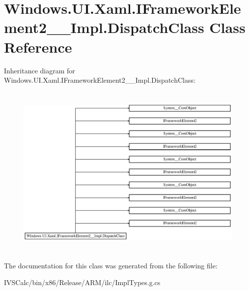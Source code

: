 \hypertarget{class_windows_1_1_u_i_1_1_xaml_1_1_i_framework_element2_____impl_1_1_dispatch_class}{}\section{Windows.\+U\+I.\+Xaml.\+I\+Framework\+Element2\+\_\+\+\_\+\+Impl.\+Dispatch\+Class Class Reference}
\label{class_windows_1_1_u_i_1_1_xaml_1_1_i_framework_element2_____impl_1_1_dispatch_class}
Inheritance diagram for Windows.\+U\+I.\+Xaml.\+I\+Framework\+Element2\+\_\+\+\_\+\+Impl.\+Dispatch\+Class\+:\begin{figure}[H]
\begin{center}
\leavevmode
\includegraphics[height=8.603352cm]{class_windows_1_1_u_i_1_1_xaml_1_1_i_framework_element2_____impl_1_1_dispatch_class}
\end{center}
\end{figure}


The documentation for this class was generated from the following file\+:\begin{DoxyCompactItemize}
\item 
I\+V\+S\+Calc/bin/x86/\+Release/\+A\+R\+M/ilc/Impl\+Types.\+g.\+cs\end{DoxyCompactItemize}

